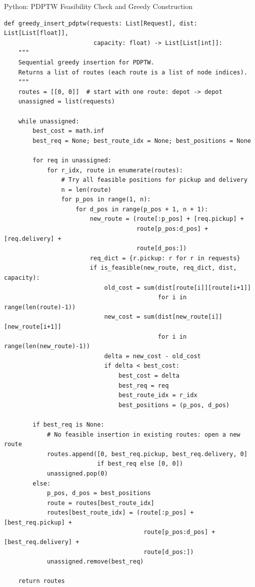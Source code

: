 \documentclass[aspectratio=169,10pt]{beamer}
\begin{document}
\begin{frame}[fragile]{Python: PDPTW Feasibility Check and Greedy Construction}
\begin{lstlisting}
def greedy_insert_pdptw(requests: List[Request], dist: List[List[float]],
                         capacity: float) -> List[List[int]]:
    """
    Sequential greedy insertion for PDPTW.
    Returns a list of routes (each route is a list of node indices).
    """
    routes = [[0, 0]]  # start with one route: depot -> depot
    unassigned = list(requests)

    while unassigned:
        best_cost = math.inf
        best_req = None; best_route_idx = None; best_positions = None

        for req in unassigned:
            for r_idx, route in enumerate(routes):
                # Try all feasible positions for pickup and delivery
                n = len(route)
                for p_pos in range(1, n):
                    for d_pos in range(p_pos + 1, n + 1):
                        new_route = (route[:p_pos] + [req.pickup] +
                                     route[p_pos:d_pos] + [req.delivery] +
                                     route[d_pos:])
                        req_dict = {r.pickup: r for r in requests}
                        if is_feasible(new_route, req_dict, dist, capacity):
                            old_cost = sum(dist[route[i]][route[i+1]]
                                           for i in range(len(route)-1))
                            new_cost = sum(dist[new_route[i]][new_route[i+1]]
                                           for i in range(len(new_route)-1))
                            delta = new_cost - old_cost
                            if delta < best_cost:
                                best_cost = delta
                                best_req = req
                                best_route_idx = r_idx
                                best_positions = (p_pos, d_pos)

        if best_req is None:
            # No feasible insertion in existing routes: open a new route
            routes.append([0, best_req.pickup, best_req.delivery, 0]
                          if best_req else [0, 0])
            unassigned.pop(0)
        else:
            p_pos, d_pos = best_positions
            route = routes[best_route_idx]
            routes[best_route_idx] = (route[:p_pos] + [best_req.pickup] +
                                       route[p_pos:d_pos] + [best_req.delivery] +
                                       route[d_pos:])
            unassigned.remove(best_req)

    return routes
\end{lstlisting}
\end{frame}
\end{document}
